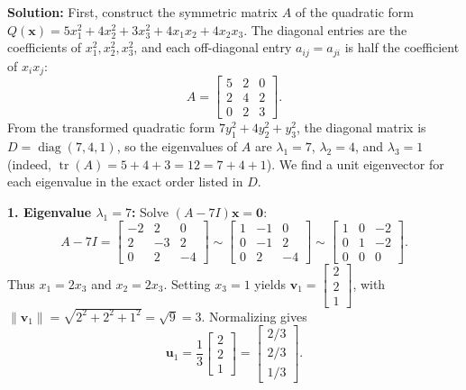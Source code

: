 \documentclass[11pt, letterpaper]{article}
\theoremstyle{definition}
\theoremstyle{remark}
\begin{document}
\textbf{Solution:}
First, construct the symmetric matrix $A$ of the quadratic form $Q(\mathbf{x}) = 5x_1^2 + 4x_2^2 + 3x_3^2 + 4x_1x_2 + 4x_2x_3$. The diagonal entries are the coefficients of $x_1^2, x_2^2, x_3^2$, and each off-diagonal entry $a_{ij} = a_{ji}$ is half the coefficient of $x_i x_j$:
\[
A = \begin{bmatrix} 5 & 2 & 0 \\ 2 & 4 & 2 \\ 0 & 2 & 3 \end{bmatrix}.
\]
From the transformed quadratic form $7y_1^2 + 4y_2^2 + y_3^2$, the diagonal matrix is $D = \operatorname{diag}(7, 4, 1)$, so the eigenvalues of $A$ are $\lambda_1 = 7$, $\lambda_2 = 4$, and $\lambda_3 = 1$ (indeed, $\operatorname{tr}(A) = 5+4+3 = 12 = 7+4+1$). We find a unit eigenvector for each eigenvalue in the exact order listed in $D$.

\textbf{1. Eigenvalue $\lambda_1 = 7$:}
Solve $(A - 7I)\mathbf{x} = \mathbf{0}$:
\[
A - 7I = \begin{bmatrix} -2 & 2 & 0 \\ 2 & -3 & 2 \\ 0 & 2 & -4 \end{bmatrix} \sim \begin{bmatrix} 1 & -1 & 0 \\ 0 & -1 & 2 \\ 0 & 2 & -4 \end{bmatrix} \sim \begin{bmatrix} 1 & 0 & -2 \\ 0 & 1 & -2 \\ 0 & 0 & 0 \end{bmatrix}.
\]
Thus $x_1 = 2x_3$ and $x_2 = 2x_3$. Setting $x_3 = 1$ yields $\mathbf{v}_1 = \begin{bmatrix} 2 \\ 2 \\ 1 \end{bmatrix}$, with $\|\mathbf{v}_1\| = \sqrt{2^2 + 2^2 + 1^2} = \sqrt{9} = 3$. Normalizing gives
\[
\mathbf{u}_1 = \frac{1}{3}\begin{bmatrix} 2 \\ 2 \\ 1 \end{bmatrix} = \begin{bmatrix} 2/3 \\ 2/3 \\ 1/3 \end{bmatrix}.
\]
\end{document}
